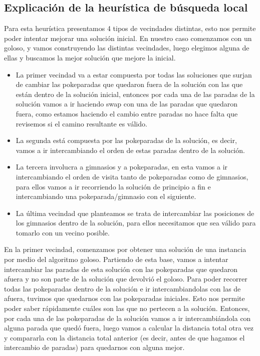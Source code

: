 \subsection{Explicación de la heurística de búsqueda local}
\label{sec: ej3_explicacion}

Para esta heurística presentamos 4 tipos de vecindades distintas, esto nos permite poder intentar mejorar una solución inicial. En nuestro caso comenzamos con un goloso, y vamos construyendo las distintas vecindades, luego elegimos alguna de ellas y buscamos la mejor solución que mejore la inicial.

\begin{itemize}

\item La primer vecindad va a estar compuesta por todas las soluciones que surjan de cambiar las pokeparadas que quedaron fuera de la solución con las que están dentro de la solución inicial, entonces por cada una de las paradas de la solución vamos a ir haciendo swap con una de las paradas que quedaron fuera, como estamos haciendo el cambio entre paradas no hace falta que revisemos si el camino resultante es válido.

\item La segunda está compuesta por las pokeparadas de la solución, es decir, vamos a ir intercambiando el orden de estas paradas dentro de la solución.

\item La tercera involucra a gimnasios y a pokeparadas, en esta vamos a ir intercambiando el orden de visita tanto de pokeparadas como de gimnasios, para ellos vamos a ir recorriendo la solución de principio a fin e intercambiando una pokeparada/gimnasio con el siguiente.

\item La última vecindad que planteamos se trata de intercambiar las posiciones de los gimnasios dentro de la solución, para ellos necesitamos que sea válido para tomarlo con un vecino posible.

\end{itemize}

En la primer vecindad, comenzamos por obtener una solución de una instancia por medio del algoritmo goloso. Partiendo de esta base, vamos a intentar intercambiar las paradas de esta solución con las pokeparadas que quedaron afuera y no son parte de la solución que devolvió el goloso. Para poder recorrer todas las pokeparadas dentro de la solución e ir intercambiandolas con las de afuera, tuvimos que quedarnos con las pokeparadas iniciales.
Esto nos permite poder saber rápidamente cuáles son las que no pertecen a la solución. Entonces, por cada una de las pokeparadas de la solución vamos a ir intercambiándola con alguna parada que quedó fuera, luego vamos a calcular la distancia total otra vez y compararla con la distancia total anterior (es decir, antes de que hagamos el intercambio de paradas) para quedarnos con alguna mejor.

